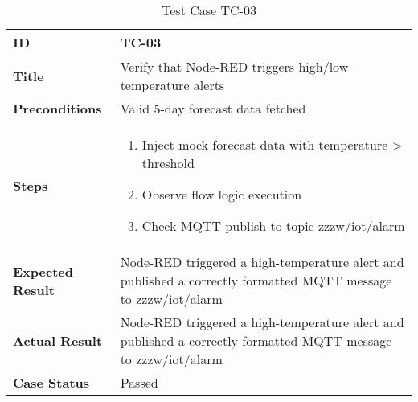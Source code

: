 \begin{table}[ht]
\centering
\begin{tabular}{|>{\raggedright\arraybackslash}p{4cm}|p{10cm}|}
\hline
\textbf{ID} & TC-03 \\
\hline
\textbf{Title} & Verify that Node-RED triggers high/low temperature alerts \\
\hline
\textbf{Preconditions} & Valid 5-day forecast data fetched \\
\hline
\textbf{Steps} & \vspace{-20pt}\begin{enumerate}
    \item Inject mock forecast data with temperature > threshold
    \item Observe flow logic execution
    \item Check MQTT publish to topic zzzw/iot/alarm
\end{enumerate} \\
\hline
\textbf{Expected Result} & Node-RED triggered a high-temperature alert and published a correctly formatted MQTT message to zzzw/iot/alarm \\
\hline
\textbf{Actual Result} & Node-RED triggered a high-temperature alert and published a correctly formatted MQTT message to zzzw/iot/alarm \\
\hline
\textbf{Case Status} & Passed \\
\hline
\end{tabular}
\caption{Test Case TC-03}
\label{tab:tc3}
\end{table}